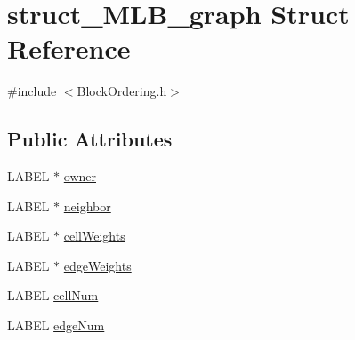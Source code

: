 \hypertarget{structstruct__MLB__graph}{
\section{struct\_\-MLB\_\-graph Struct Reference}
\label{structstruct__MLB__graph}
}


{\ttfamily \#include $<$BlockOrdering.h$>$}\subsection*{Public Attributes}
\begin{DoxyCompactItemize}
\item 
LABEL $\ast$ \hyperlink{structstruct__MLB__graph_a10be24e6c4971235fd9fbb8b2216d749}{owner}
\item 
LABEL $\ast$ \hyperlink{structstruct__MLB__graph_a7eb36bae724d139d7fc21d94e6199cfc}{neighbor}
\item 
LABEL $\ast$ \hyperlink{structstruct__MLB__graph_ab0d8599c1eddf6e226a1f8d932acdaa9}{cellWeights}
\item 
LABEL $\ast$ \hyperlink{structstruct__MLB__graph_a39be8b4a7c4cfb06f1e0abb7ec78a7e3}{edgeWeights}
\item 
LABEL \hyperlink{structstruct__MLB__graph_ae3744293c04d9748ae6e3072721f4aad}{cellNum}
\item 
LABEL \hyperlink{structstruct__MLB__graph_a6073161bbd907d86c2de319af24cbcc5}{edgeNum}
\end{DoxyCompactItemize}


